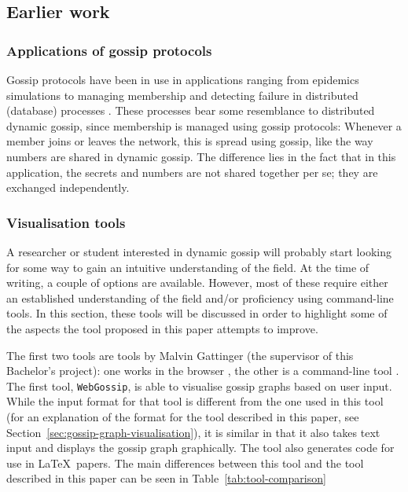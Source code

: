 \subsection{Earlier work}

\subsubsection{Applications of gossip protocols}

Gossip protocols have been in use in applications ranging from epidemics simulations \addcite to managing membership and detecting failure in distributed (database) processes \parencite{decandia_dynamo_2007, das_swim_2002}.
These processes bear some resemblance to distributed dynamic gossip, since membership is managed using gossip protocols:
Whenever a member joins or leaves the network, this is spread using gossip, like the way numbers are shared in dynamic gossip.
The difference lies in the fact that in this application, the secrets and numbers are not shared together per se;
they are exchanged independently.

\subsubsection{Visualisation tools}

A researcher or student interested in dynamic gossip will probably start looking for some way to gain an intuitive understanding of the field.
At the time of writing, a couple of options are available.
However, most of these require either an established understanding of the field and/or proficiency using command-line tools.
In this section, these tools will be discussed in order to highlight some of the aspects the tool proposed in this paper attempts to improve.

The first two tools are tools by Malvin Gattinger (the supervisor of this Bachelor's project):
one works in the browser \parencite{gattinger_webgossip_nodate}, the other is a command-line tool \parencite{gattinger_m4lvingomoche_2020}. 
The first tool, \texttt{WebGossip}, is able to visualise gossip graphs based on user input.
While the input format for that tool is different from the one used in this tool
(for an explanation of the format for the tool described in this paper, see Section~\ref{sec:gossip-graph-visualisation}),
it is similar in that it also takes text input and displays the gossip graph graphically.
The tool also generates code for use in \LaTeX\ papers.
The main differences between this tool and the tool described in this paper can be seen in Table~\ref{tab:tool-comparison}

